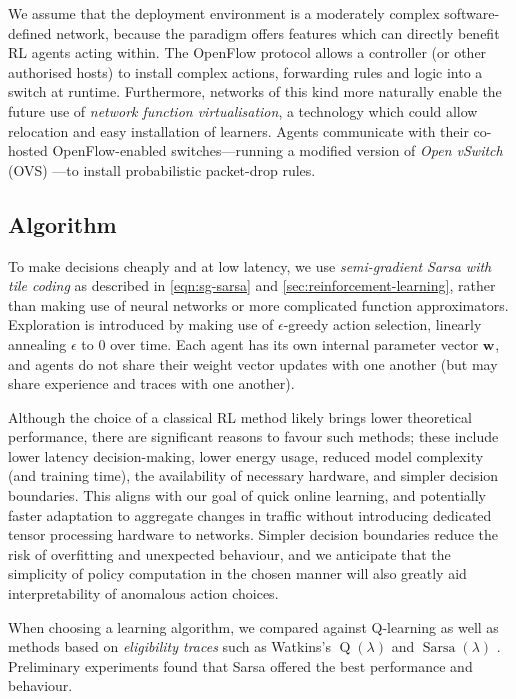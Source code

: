 \documentclass[10pt, times, comsoc]{IEEEtran}
\newcommand{\wvec}[1]{\ensuremath{\bm{w}_{#1}}}
\begin{document}
We assume that the deployment environment is a moderately complex software-defined network, because the paradigm offers features which can directly benefit RL agents acting within.
The OpenFlow protocol allows a controller (or other authorised hosts) to install complex actions, forwarding rules and logic into a switch at runtime.
Furthermore, networks of this kind more naturally enable the future use of \emph{network function virtualisation}, a technology which could allow relocation and easy installation of learners.
Agents communicate with their co-hosted OpenFlow-enabled switches---running a modified version of \emph{Open vSwitch} (OVS) \cite{open-vswitch}---to install probabilistic packet-drop rules.

\subsection{Algorithm}
To make decisions cheaply and at low latency, we use \emph{semi-gradient Sarsa with tile coding} as described in \cref{eqn:sg-sarsa} and \cref{sec:reinforcement-learning}, rather than making use of neural networks or more complicated function approximators.
Exploration is introduced by making use of $\epsilon$-greedy action selection, linearly annealing $\epsilon$ to 0 over time.
Each agent has its own internal parameter vector $\wvec{}$, and agents do not share their weight vector updates with one another (but may share experience and traces with one another).

Although the choice of a classical RL method likely brings lower theoretical performance, there are significant reasons to favour such methods; these include lower latency decision-making, lower energy usage, reduced model complexity (and training time), the availability of necessary hardware, and simpler decision boundaries.
This aligns with our goal of quick online learning, and potentially faster adaptation to aggregate changes in traffic without introducing dedicated tensor processing hardware to networks.
Simpler decision boundaries reduce the risk of overfitting and unexpected behaviour, and we anticipate that the simplicity of policy computation in the chosen manner will also greatly aid interpretability of anomalous action choices.

When choosing a learning algorithm, we compared against Q-learning as well as methods based on \emph{eligibility traces} such as Watkins's $\operatorname{Q}(\lambda)$ \cite[pp. 312--314]{RL2E} and $\operatorname{Sarsa}(\lambda)$ \cite[pp. 305]{RL2E}.
Preliminary experiments found that Sarsa offered the best performance and behaviour.
\end{document}
